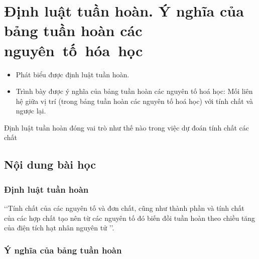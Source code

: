 \section[Định luật tuần hoàn]{Định luật tuần hoàn. Ý nghĩa của bảng tuần hoàn các nguyên~tố~hóa~học}
\vspace{1.25cm}
\begin{Muctieu}
	\begin{itemize}
		\item  Phát biểu được định luật tuần hoàn.
		\item  Trình bày được ý nghĩa của bảng tuần hoàn các nguyên tố hoá học: Mối liên hệ giữa vị trí (trong bảng tuần hoàn các nguyên tố hoá học) với tính chất và ngược lại.
	\end{itemize}
\end{Muctieu}
\begin{kd}
	Định luật tuần hoàn đóng vai trò như thế nào trong việc dự đoán tính chất các chất
\end{kd}
\subsection{Nội dung bài học}
	\subsubsection{Định luật tuần hoàn}
	\vspace{0.25 cm}
	\begin{tomtat}
		\lq\lq Tính chất của các nguyên tố và đơn chất, cũng như thành phần và tính chất của các hợp chất tạo nên từ các nguyên tố đó biến đồi tuần hoàn theo chiều tăng của điện tích hạt nhân nguyên tử \rq\rq.
	\end{tomtat}
	\subsubsection{Ý nghĩa của bảng tuần hoàn}

